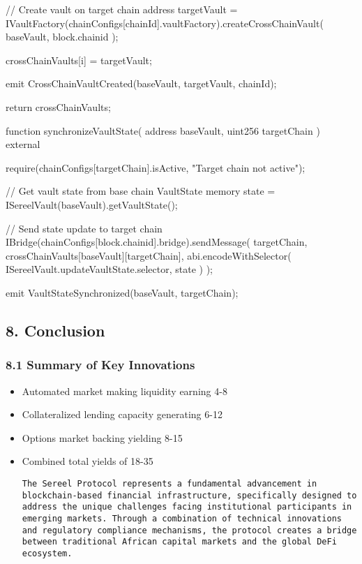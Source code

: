 \documentclass[12pt]{article}
\begin{document}
{{{{{{            // Create vault on target chain            address targetVault = IVaultFactory(chainConfigs[chainId].vaultFactory).createCrossChainVault(                baseVault,                block.chainid            );

            crossChainVaults[i] = targetVault;

            emit CrossChainVaultCreated(baseVault, targetVault, chainId);        }

        return crossChainVaults;    }

    function synchronizeVaultState(        address baseVault,        uint256 targetChain    ) external {        require(chainConfigs[targetChain].isActive, "Target chain not active");

        // Get vault state from base chain        VaultState memory state = ISereelVault(baseVault).getVaultState();

        // Send state update to target chain        IBridge(chainConfigs[block.chainid].bridge).sendMessage(            targetChain,            crossChainVaults[baseVault][targetChain],            abi.encodeWithSelector(                ISereelVault.updateVaultState.selector,                state            )        );

        emit VaultStateSynchronized(baseVault, targetChain);    }}
\subsection{8. Conclusion} %
\subsubsection{8.1 Summary of Key Innovations} %
\begin{itemize}
	\item Automated market making liquidity earning 4-8%
	\item Collateralized lending capacity generating 6-12%
	\item Options market backing yielding 8-15%
	\item Combined total yields of 18-35%

\begin{lstlisting}
The Sereel Protocol represents a fundamental advancement in blockchain-based financial infrastructure, specifically designed to address the unique challenges facing institutional participants in emerging markets. Through a combination of technical innovations and regulatory compliance mechanisms, the protocol creates a bridge between traditional African capital markets and the global DeFi ecosystem.



\end{lstlisting}
\end{itemize}}}}
\end{document}

